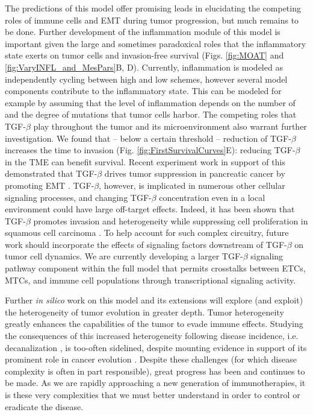 \documentclass[11pt]{article}
\begin{document}
The predictions of this model offer promising leads in elucidating the competing roles of immune cells and EMT during tumor progression, but much remains to be done. Further development of the inflammation module of this model is important given the large and sometimes paradoxical roles that the inflammatory state exerts on tumor cells and invasion-free survival (Figs. \ref{fig:MOAT} and \ref{fig:VaryINFL_and_MesPars}B, D). Currently, inflammation is modeled as independently cycling between high and low schemes, however several model components contribute to the inflammatory state. This can be modeled for example by assuming that the level of inflammation depends on the number of and the degree of mutations that tumor cells harbor.
The competing roles that TGF-$\beta$ play throughout the tumor and its microenvironment also warrant further investigation. We found that -- below a certain threshold -- reduction of TGF-$\beta$ increases the time to invasion (Fig. \ref{fig:FirstSurvivalCurves}E): reducing  TGF-$\beta$ in the TME can benefit survival. Recent experiment work in support of this demonstrated that TGF-$\beta$ drives tumor suppression in pancreatic cancer by promoting EMT \cite{david16_tgfv}. TGF-$\beta$, however, is implicated in numerous other cellular signaling processes, and changing TGF-$\beta$ concentration even in a local environment could have large off-target effects. Indeed, it has been shown that TGF-$\beta$ promotes invasion and heterogeneity while  suppressing cell proliferation in squamous cell carcinoma \cite{oshimori15_tgfv}. To help account for such complex circuitry, future work should incorporate the effects of signaling factors downstream of TGF-$\beta$ on tumor cell dynamics. We are currently developing a larger TGF-$\beta$ signaling pathway component within the full model that permits crosstalks between ETCs, MTCs, and immune cell populations through transcriptional signaling activity.
\par
Further {\em in silico} work on this model and its extensions will explore (and exploit) the heterogeneity of tumor evolution in greater depth. Tumor heterogeneity greatly enhances the capabilities of the tumor to evade immune effects. Studying the consequences of this increased heterogeneity following disease incidence, i.e. decanalization \cite{gibson09_decanalization}, is too-often sidelined, despite mounting evidence in support of its prominent role in cancer evolution \cite{cyll17_tumour, punt17_tumour, dagogo-jack18_tumour}. Despite these challenges (for which disease complexity is often in part responsible), great progress has been and continues to be made. As we are rapidly approaching a new generation of immunotherapies, it is these very complexities that we must better understand in order to control or eradicate the disease.
\end{document}
